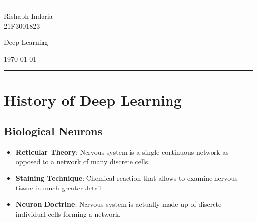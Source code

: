 \documentclass[a4paper]{article}
\begin{document}
\fancyhead[c]{}
\hrule \medskip
\begin{minipage}{0.295\textwidth}
\raggedright
Rishabh Indoria\\
21F3001823
\end{minipage}
\begin{minipage}{0.4\textwidth}
\centering
\LARGE
Deep Learning
\end{minipage}
\begin{minipage}{0.295\textwidth}
\raggedleft
\today \hfill \\
\end{minipage}
\medskip \hrule
\bigskip

\section{History of Deep Learning}

\subsection{Biological Neurons}
\begin{itemize}
    \item \textbf{Reticular Theory}: Nervous system is a single continuous network as opposed to a network of many discrete cells.
    \item \textbf{Staining Technique}: Chemical reaction that allows to examine nervous tissue in much greater detail.
    \item \textbf{Neuron Doctrine}: Nervous system is actually made up of discrete individual cells forming a network.
\end{itemize}
\end{document}
